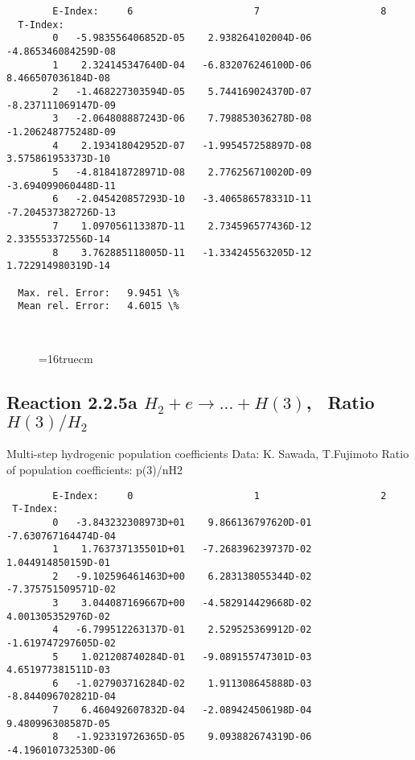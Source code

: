 \documentclass[12pt,dvipdfmx]{article}
\begin{document}
{\begin{small}
\begin{verbatim}
        E-Index:     6                     7                     8
  T-Index:
        0   -5.983556406852D-05    2.938264102004D-06   -4.865346084259D-08
        1    2.324145347640D-04   -6.832076246100D-06    8.466507036184D-08
        2   -1.468227303594D-05    5.744169024370D-07   -8.237111069147D-09
        3   -2.064808887243D-06    7.798853036278D-08   -1.206248775248D-09
        4    2.193418042952D-07   -1.995457258897D-08    3.575861953373D-10
        5   -4.818418728971D-08    2.776256710020D-09   -3.694099060448D-11
        6   -2.045420857293D-10   -3.406586578331D-11   -7.204537382726D-13
        7    1.097056113387D-11    2.734596577436D-12    2.335553372556D-14
        8    3.762885118005D-11   -1.334245563205D-12    1.722914980319D-14

  Max. rel. Error:   9.9451 \%
  Mean rel. Error:   4.6015 \%



\end{verbatim}\end{small}
\begin{figure} \label{2.3.6lr1}
\epsfxsize=16truecm
\end{figure}
\newpage

\subsection{
Reaction 2.2.5a $ H_2 + e \rightarrow ...+ H(3) $, \    Ratio $H(3)/H_2 $
}
 Multi-step hydrogenic population coefficients
 Data: K. Sawada, T.Fujimoto \cite{kn:Sawada}
 Ratio of population coefficients: p(3)/nH2


\begin{small}\begin{verbatim}
        E-Index:     0                     1                     2
 T-Index:
        0   -3.843232308973D+01    9.866136797620D-01   -7.630767164474D-04
        1    1.763737135501D+01   -7.268396239737D-02    1.044914850159D-01
        2   -9.102596461463D+00    6.283138055344D-02   -7.375751509571D-02
        3    3.044087169667D+00   -4.582914429668D-02    4.001305352976D-02
        4   -6.799512263137D-01    2.529525369912D-02   -1.619747297605D-02
        5    1.021208740284D-01   -9.089155747301D-03    4.651977381511D-03
        6   -1.027903716284D-02    1.911308645888D-03   -8.844096702821D-04
        7    6.460492607832D-04   -2.089424506198D-04    9.480996308587D-05
        8   -1.923319726365D-05    9.093882674319D-06   -4.196010732530D-06


\end{verbatim}
\end{small}}
\end{document}
